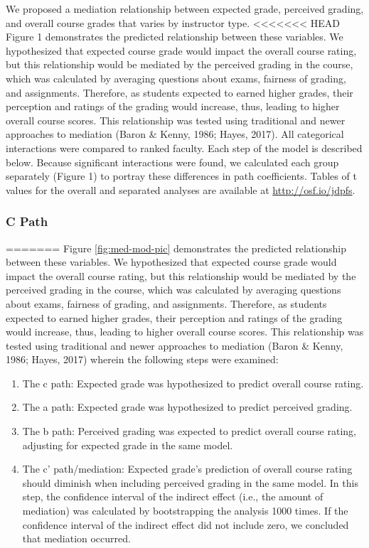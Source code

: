 \documentclass[,man]{apa6}
\providecommand{\tightlist}{%
  \setlength{\itemsep}{0pt}\setlength{\parskip}{0pt}}
\theoremstyle{definition}
\theoremstyle{definition}
\theoremstyle{definition}
\theoremstyle{remark}
\begin{document}
We proposed a mediation relationship between expected grade, perceived
grading, and overall course grades that varies by instructor type.
<<<<<<< HEAD
Figure 1 demonstrates the predicted relationship between these
variables. We hypothesized that expected course grade would impact the
overall course rating, but this relationship would be mediated by the
perceived grading in the course, which was calculated by averaging
questions about exams, fairness of grading, and assignments. Therefore,
as students expected to earned higher grades, their perception and
ratings of the grading would increase, thus, leading to higher overall
course scores. This relationship was tested using traditional and newer
approaches to mediation (Baron \& Kenny, 1986; Hayes, 2017). All
categorical interactions were compared to ranked faculty. Each step of
the model is described below. Because significant interactions were
found, we calculated each group separately (Figure 1) to portray these
differences in path coefficients. Tables of t values for the overall and
separated analyses are available at \url{http://osf.io/jdpfs}.

\subsubsection{C Path}\label{c-path}
=======
Figure \ref{fig:med-mod-pic} demonstrates the predicted relationship
between these variables. We hypothesized that expected course grade
would impact the overall course rating, but this relationship would be
mediated by the perceived grading in the course, which was calculated by
averaging questions about exams, fairness of grading, and assignments.
Therefore, as students expected to earned higher grades, their
perception and ratings of the grading would increase, thus, leading to
higher overall course scores. This relationship was tested using
traditional and newer approaches to mediation (Baron \& Kenny, 1986;
Hayes, 2017) wherein the following steps were examined:

\begin{enumerate}
\def\labelenumi{\arabic{enumi})}
\tightlist
\item
  The c path: Expected grade was hypothesized to predict overall course
  rating.
\item
  The a path: Expected grade was hypothesized to predict perceived
  grading.
\item
  The b path: Perceived grading was expected to predict overall course
  rating, adjusting for expected grade in the same model.
\item
  The c' path/mediation: Expected grade's prediction of overall course
  rating should diminish when including perceived grading in the same
  model. In this step, the confidence interval of the indirect effect
  (i.e., the amount of mediation) was calculated by bootstrapping the
  analysis 1000 times. If the confidence interval of the indirect effect
  did not include zero, we concluded that mediation occurred.
\end{enumerate}
\end{document}
